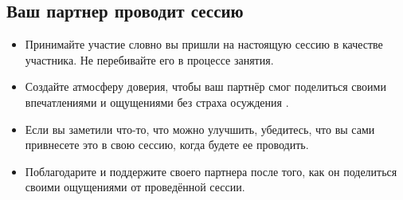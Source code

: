 \documentclass[
a4paper, %
12pt, %
article,
onecolumn, %
openany, %
]{memoir}
\begin{document}
\subsection*{Ваш партнер проводит сессию}
\begin{itemize}
\item Принимайте участие словно вы пришли на настоящую сессию в качестве участника. Не
перебивайте его в процессе занятия.
\item Создайте атмосферу доверия, чтобы ваш партнёр смог поделиться своими
впечатлениями и ощущениями без страха осуждения \faSmileO.
\item Если вы заметили что-то, что можно улучшить, убедитесь, что вы сами привнесете это в
свою сессию, когда будете ее проводить.
\item Поблагодарите и поддержите своего партнера после того, как он поделиться своими
ощущениями от проведённой сессии.
\end{itemize} 
\end{document}
